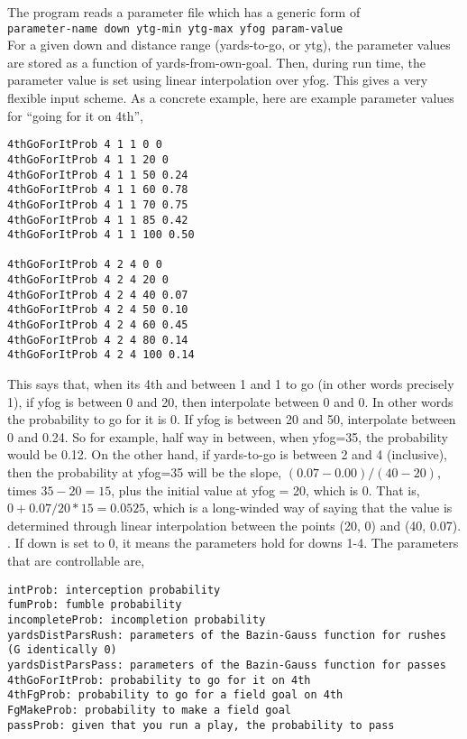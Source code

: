 \documentclass{article}
\begin{document}
The program reads a parameter file which has a generic form of \\

{\tt parameter-name down ytg-min ytg-max yfog param-value} \\

For a given down and distance range (yards-to-go, or ytg), the parameter values are stored as a function of yards-from-own-goal. Then, during run time, the parameter value is set using linear interpolation over yfog. This gives a very flexible input scheme. As a concrete example, here are example parameter values for ``going for it on 4th'',

\begin{verbatim}
4thGoForItProb 4 1 1 0 0
4thGoForItProb 4 1 1 20 0
4thGoForItProb 4 1 1 50 0.24
4thGoForItProb 4 1 1 60 0.78
4thGoForItProb 4 1 1 70 0.75
4thGoForItProb 4 1 1 85 0.42
4thGoForItProb 4 1 1 100 0.50

4thGoForItProb 4 2 4 0 0
4thGoForItProb 4 2 4 20 0
4thGoForItProb 4 2 4 40 0.07
4thGoForItProb 4 2 4 50 0.10
4thGoForItProb 4 2 4 60 0.45
4thGoForItProb 4 2 4 80 0.14
4thGoForItProb 4 2 4 100 0.14
\end{verbatim}

This says that, when its 4th and between 1 and 1 to go (in other words precisely 1), if yfog is between 0 and 20, then interpolate between 0 and 0. In other words the probability to go for it is 0. If yfog is between 20 and 50, interpolate between 0 and 0.24. So for example, half way in between, when yfog=35, the probability would be 0.12. On the other hand, if yards-to-go is between 2 and 4 (inclusive), then the probability at yfog=35 will be the slope, $(0.07-0.00)/(40-20)$, times $35-20 = 15$, plus the initial value at yfog = 20, which is 0. That is, $0 + 0.07/20*15 = 0.0525$, which is a long-winded way of saying that the value is determined through linear interpolation between the points (20, 0) and (40, 0.07). 
. If down is set to 0, it means the parameters hold for downs 1-4. The parameters that are controllable are,

\begin{verbatim}
intProb: interception probability
fumProb: fumble probability
incompleteProb: incompletion probability
yardsDistParsRush: parameters of the Bazin-Gauss function for rushes (G identically 0)
yardsDistParsPass: parameters of the Bazin-Gauss function for passes
4thGoForItProb: probability to go for it on 4th
4thFgProb: probability to go for a field goal on 4th
FgMakeProb: probability to make a field goal
passProb: given that you run a play, the probability to pass
\end{verbatim}
\end{document}
